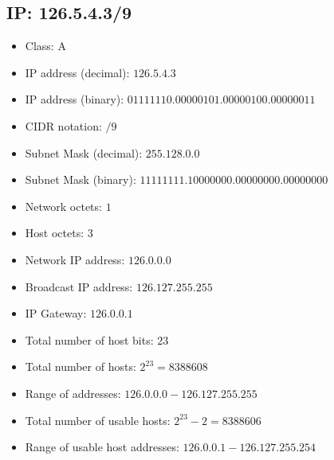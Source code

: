 \documentclass{article}
\begin{document}
\subsection*{IP: 126.5.4.3/9}
  \begin{itemize}
    \item Class: A
    \item IP address (decimal): $126.5.4.3$
    \item IP address (binary): $01111110.00000101.00000100.00000011$
    \item CIDR notation: $/9$
    \item Subnet Mask (decimal): $255.128.0.0$ 
    \item Subnet Mask (binary): $11111111.10000000.00000000.00000000$
    \item Network octets: $1$
    \item Host octets: $3$
    \item Network IP address: $126.0.0.0$
    \item Broadcast IP address: $126.127.255.255$
    \item IP Gateway: $126.0.0.1$
    \item Total number of host bits: $23$
    \item Total number of hosts: $2^{23} = 8388608$
    \item Range of addresses: $126.0.0.0 - 126.127.255.255$
    \item Total number of usable hosts: $2^{23} - 2 = 8388606$
    \item Range of usable host addresses: $126.0.0.1 - 126.127.255.254$
  \end{itemize}
\end{document}
